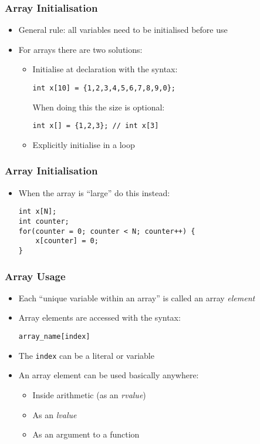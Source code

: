 \documentclass[14pt]{beamer}
\begin{document}
\begin{frame}[fragile]
\frametitle{Array Initialisation}
\begin{itemize}
\item General rule: all variables need to be initialised before use
\item For arrays there are two solutions:
	\begin{itemize}
		\item Initialise at declaration with the syntax:
		\begin{lstlisting}[style=CStyle]
		int x[10] = {1,2,3,4,5,6,7,8,9,0};
		\end{lstlisting}
		When doing this the size is optional:
		\begin{lstlisting}[style=CStyle]
		int x[] = {1,2,3}; // int x[3]
		\end{lstlisting}
		\item Explicitly initialise in a loop
	\end{itemize}
\end{itemize}
\end{frame}

\begin{frame}[fragile]
\frametitle{Array Initialisation}
\begin{itemize}
\item When the array is ``large'' do this instead:
\begin{lstlisting}[style=CStyle]
int x[N];
int counter;
for(counter = 0; counter < N; counter++) {
	x[counter] = 0;
}
\end{lstlisting}
\end{itemize}
\end{frame}

\begin{frame}[fragile]
\frametitle{Array Usage}
\begin{itemize}
\item Each ``unique variable within an array'' is called an array \textit{element}
\item Array elements are accessed with the syntax:
\begin{lstlisting}[style=Ctable]
array_name[index]
\end{lstlisting}
\pause
\item The \texttt{index} can be a literal or variable
\pause
\item An array element can be used basically anywhere:
	\begin{itemize}
		\item Inside arithmetic (as an \textit{rvalue})
		\item As an \textit{lvalue}
		\item As an argument to a function
	\end{itemize}
\end{itemize}
\end{frame}
\end{document}

